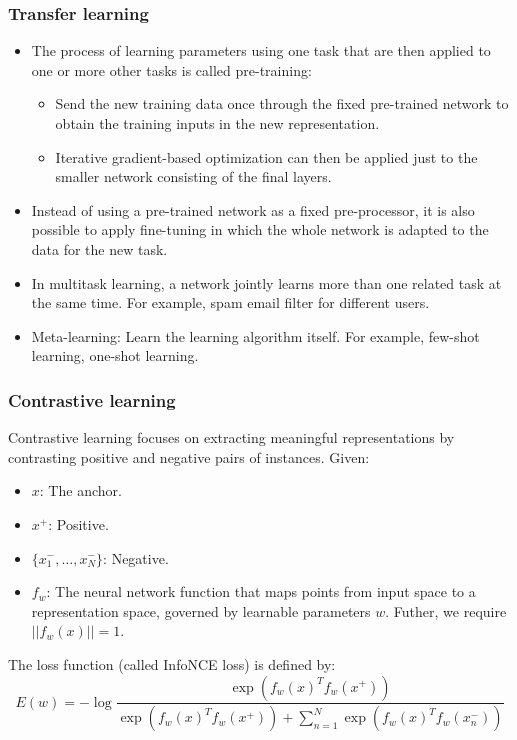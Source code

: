 \documentclass{beamer}
\begin{document}
\begin{frame}
    \frametitle{Transfer learning}
    \begin{itemize}
        \item The process of learning parameters using one task that are then applied to one or more other tasks is called pre-training:
        \begin{itemize}
            \item Send the new training data once through the fixed pre-trained network to obtain the training inputs in the new representation.
            \item Iterative gradient-based optimization can then be applied just to the smaller network consisting of the final layers.
        \end{itemize}
        \item Instead of using a pre-trained network as a fixed pre-processor, it is also possible to apply fine-tuning in which the whole network is adapted to the data for the new task.
        \item In multitask learning, a network jointly learns more than one related task at the same time. For example, spam email filter for different users.
        \item Meta-learning: Learn the learning algorithm itself. For example, few-shot learning, one-shot learning.
    \end{itemize}
\end{frame}

\begin{frame}
    \frametitle{Contrastive learning}
    Contrastive learning focuses on extracting meaningful representations by contrasting positive and negative pairs of instances. Given:
    \begin{itemize}
        \item $x$: The anchor.
        \item $x^{+}$: Positive.
        \item $\{x^{-}_{1},\hdots,x^{-}_{N}\}$: Negative.
        \item $f_{w}$: The neural network function that maps points from input space to a representation space, governed by learnable parameters $w$. Futher, we require $||f_{w}(x)||=1$.
    \end{itemize}
    The loss function (called InfoNCE loss) is defined by:
    \begin{equation*}
        E(w)=-\log\frac{\exp(f_{w}(x)^{T}f_{w}(x^{+}))}{\exp(f_{w}(x)^{T}f_{w}(x^{+}))+\sum_{n=1}^{N}\exp(f_{w}(x)^{T}f_{w}(x^{-}_{n}))}
    \end{equation*}
\end{frame}
\end{document}
